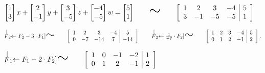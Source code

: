 \documentclass[11pt]{article}
\newcommand{\semejante}[1]{\stackrel[#1]{}{\text{\huge$\sim$}}}%
\newcommand{\indicador}[4]{
{\tikz[remember picture,overlay]\coordinate (#1) at #2;}{\tikz[remember picture,overlay]\coordinate (#3) at #4;} 
}
\begin{document}
\begin{enumerate}[\hspace{-5mm} 1) ]
\begin{enumerate}[i)]
$\begin{bmatrix} 1 \\ 3 \end{bmatrix} x + \begin{bmatrix} 2 \\ -1 \end{bmatrix} y + \begin{bmatrix} 3 \\ -5 \end{bmatrix} z  + \begin{bmatrix} -4 \\ -5 \end{bmatrix} w= \begin{bmatrix} 5 \\ 1  \end{bmatrix}
\qquad
\text{\huge$\sim$}
\qquad%
\left[
\begin{array}{cccc|c}
1 & 2 & 3 & -4 & 5 \\
3 & -1 & -5 & -5 & 1
\end{array}
\right]$

\bigskip

$
\semejante{F_2\leftarrow F_2 - 3 \cdot F_1  } 
\qquad 
\left[
\begin{array}{cccc|c}
1 & 2 & 3 & -4 & 5 \\
0 & -7 & -14 & 7 & -14
\end{array}
\right]
\qquad 
\semejante{F_2\leftarrow  \frac{1}{-7} \cdot F_2  }
\qquad 
\left[
\begin{array}{cccc|c}
1 & 2 & 3 & -4 & 5 \\
0 & 1 & 2 & -1 & 2
\end{array}
\right].
$

\bigskip

$
\semejante{F_1\leftarrow F_1 - 2 \cdot F_2  }
\qquad 
\left[
\begin{array}{cccc|c}
1 & 0 & -1 & -2 & 1 \\
0 & 1 & 2 & -1 & 2
\end{array}
\right]
\indicador{a1}{(.1,-.19)}{a2}{(.5,-.19)} 
$
%
%
%
%
%
%
%
%
%


\end{enumerate}
\end{enumerate}
\end{document}
